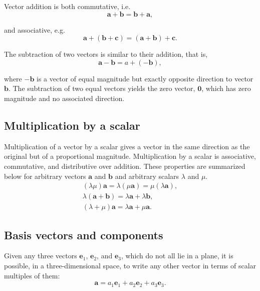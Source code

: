 \documentclass{article}
\begin{document}
Vector addition is both commutative, i.e.
\begin{equation*}
    \bm{a} + \bm{b} = \bm{b} + \bm{a},
\end{equation*}

and associative, e.g.
\begin{equation*}
    \bm{a} + \left( \bm{b} + \bm{c} \right) = \left( \bm{a} + \bm{b} \right) + \bm{c}.
\end{equation*}

The subtraction of two vectors is similar to their addition, that is,
\begin{equation*}
    \bm{a} - \bm{b} = a + \left( -\bm{b} \right),
\end{equation*}

where $-\bm{b}$ is a vector of equal magnitude but exactly opposite direction to vector $\bm{b}$. The subtraction of two equal vectors yields the zero vector, $\bm{0}$, which has zero magnitude and no associated direction.

\subsection{Multiplication by a scalar}

Multiplication of a vector by a scalar gives a vector in the same direction as the original but of a proportional magnitude. Multiplication by a scalar is associative, commutative, and distributive over addition. These properties are summarized below for arbitrary vectors $\bm{a}$ and $\bm{b}$ and arbitrary scalars $\lambda$ and $\mu$.
\begin{gather*}
    \left( \lambda \mu \right) \bm{a} = \lambda \left( \mu \bm{a} \right) = \mu \left( \lambda \bm{a} \right), \\
    \lambda \left( \bm{a} + \bm{b} \right) = \lambda \bm{a} + \lambda \bm{b}, \\
    \left( \lambda + \mu \right) \bm{a} = \lambda \bm{a} + \mu \bm{a}.
\end{gather*}

\subsection{Basis vectors and components}

Given any three vectors $\mathbf{e}_1$, $\mathbf{e}_2$, and $\mathbf{e}_3$, which do not all lie in a plane, it is possible, in a three-dimensional space, to write any other vector in terms of scalar multiples of them:
\begin{equation*}
    \bm{a} = a_1 \mathbf{e}_1 + a_2 \mathbf{e}_2 + a_3 \mathbf{e}_3.
\end{equation*}
\end{document}
